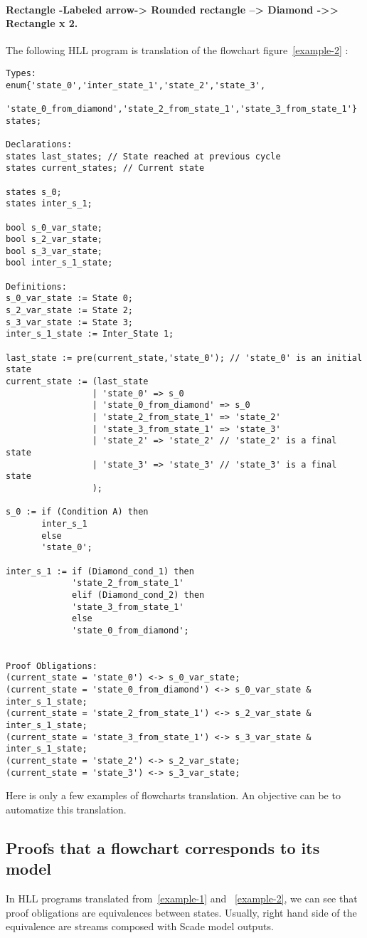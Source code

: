 \paragraph{Rectangle -Labeled arrow-> Rounded rectangle --> Diamond ->> Rectangle x 2.}
The following HLL program is translation of the flowchart
figure~\ref{example-2} : 
{\footnotesize
\begin{verbatim}
Types:
enum{'state_0','inter_state_1','state_2','state_3',
     'state_0_from_diamond','state_2_from_state_1','state_3_from_state_1'} states;

Declarations:
states last_states; // State reached at previous cycle
states current_states; // Current state

states s_0;
states inter_s_1;

bool s_0_var_state;
bool s_2_var_state;
bool s_3_var_state;
bool inter_s_1_state;

Definitions:
s_0_var_state := State 0;
s_2_var_state := State 2;
s_3_var_state := State 3;
inter_s_1_state := Inter_State 1;

last_state := pre(current_state,'state_0'); // 'state_0' is an initial state
current_state := (last_state
                 | 'state_0' => s_0
                 | 'state_0_from_diamond' => s_0
                 | 'state_2_from_state_1' => 'state_2'
                 | 'state_3_from_state_1' => 'state_3'
                 | 'state_2' => 'state_2' // 'state_2' is a final state
                 | 'state_3' => 'state_3' // 'state_3' is a final state
                 );

s_0 := if (Condition A) then
       inter_s_1
       else
       'state_0';

inter_s_1 := if (Diamond_cond_1) then
             'state_2_from_state_1'
             elif (Diamond_cond_2) then
             'state_3_from_state_1'
             else
             'state_0_from_diamond';


Proof Obligations:
(current_state = 'state_0') <-> s_0_var_state;
(current_state = 'state_0_from_diamond') <-> s_0_var_state & inter_s_1_state;
(current_state = 'state_2_from_state_1') <-> s_2_var_state & inter_s_1_state;
(current_state = 'state_3_from_state_1') <-> s_3_var_state & inter_s_1_state;
(current_state = 'state_2') <-> s_2_var_state;
(current_state = 'state_3') <-> s_3_var_state;
\end{verbatim}
}

Here is only a few examples of flowcharts translation. An objective
can be to automatize this translation.




\subsection{Proofs that a flowchart corresponds to its model}

In HLL programs translated from~\ref{example-1} and ~\ref{example-2},
we can see that proof obligations are equivalences between
states. Usually, right hand side of the equivalence are streams
composed with Scade model outputs. 
